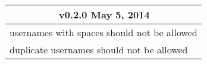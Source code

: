 \documentclass[notitlepage]{article}
\newcommand{\releasedate}{May 5, 2014}
\begin{document}
\begin{center}
\begin{tabular}{ | l | }
\hline
\LARGE\cellcolor{myblue}\textcolor{white}{khallware} v0.2.0 \releasedate{} \\
\hline
usernames with spaces should not be allowed \\
\hline
duplicate usernames should not be allowed \\
\hline

\end{tabular}
\end{center}
\end{document}

